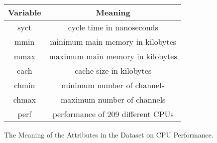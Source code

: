 \documentclass[12pt]{article}
\begin{document}
\begin{enumerate}
\begin{enumerate}
\end{enumerate}

\begin{figure}[h]

  \centering

  \begin{tabular}{c | c}

    {\bf Variable} & {\bf Meaning} \\ \hline

    syct & cycle time in nanoseconds \\ \hline

    mmin & minimum main memory in kilobytes \\ \hline

    mmax & maximum main memory in kilobytes \\ \hline

    cach & cache size in kilobytes \\ \hline

    chmin & minimum number of channels \\ \hline

    chmax & maximum number of channels \\ \hline

    perf & performance of 209 different CPUs

  \end{tabular} 
  \caption{The Meaning of the Attributes in the Dataset on CPU Performance.}

\end{figure}


\end{enumerate}
\end{document}
